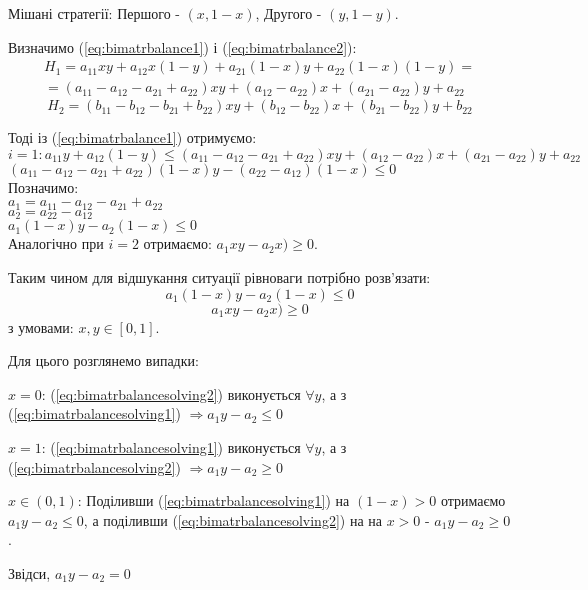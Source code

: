 \documentclass[12pt,a4paper]{book}
\newenvironment{slim_enumerate}{
\begin{enumerate}
  \setlength{\itemsep}{1pt}
  \setlength{\parskip}{0pt}
  \setlength{\parsep}{0pt}}
{\end{enumerate}}
\begin{document}
Мішані стратегії: Першого - $(x,1-x)$, Другого - $(y,1-y)$.

Визначимо (\ref{eq:bimatrbalance1}) і (\ref{eq:bimatrbalance2}):\\
\[\begin{array}{c}
H_1 = a_{11}xy + a_{12}x(1-y) + a_{21}(1-x)y + a_{22}(1-x)(1-y) =\\
= (a_{11}-a_{12}-a_{21}+a_{22})xy + (a_{12}-a_{22})x + (a_{21}-a_{22})y + a_{22}
\end{array}\]
\[H_2 = (b_{11}-b_{12}-b_{21}+b_{22})xy + (b_{12}-b_{22})x + (b_{21}-b_{22})y + b_{22} \]

Тоді із (\ref{eq:bimatrbalance1}) отримуємо:\\
$ i=1: a_{11}y+a_{12}(1-y) \leq (a_{11}-a_{12}-a_{21}+a_{22})xy + (a_{12}-a_{22})x + (a_{21}-a_{22})y + a_{22} $\\
$(a_{11}-a_{12}-a_{21}+a_{22})(1-x)y - (a_{22}-a_{12})(1-x) \leq 0$\\
Позначимо:\\
$a_1 = a_{11}-a_{12}-a_{21}+a_{22}$\\
$a_2 = a_{22}-a_{12}$\\
$a_1(1-x)y - a_2(1-x) \leq 0$\\
Аналогічно при $i=2$ отримаємо: $a_1xy - a_2x) \geq 0$.

Таким чином для відшукання ситуації рівноваги потрібно розв’язати:
\begin{equation} a_1(1-x)y - a_2(1-x) \leq 0 \label{eq:bimatrbalancesolving1} \end{equation}
\begin{equation} a_1xy - a_2x) \geq 0 \label{eq:bimatrbalancesolving2} \end{equation}
з умовами: $x,y \in [0,1]$.

Для цього розглянемо випадки:
\begin{slim_enumerate}
  \item $x=0$: (\ref{eq:bimatrbalancesolving2}) виконується $\forall y$, а з (\ref{eq:bimatrbalancesolving1}) $\Rightarrow a_1 y - a_2 \leq 0$
  \item $x=1$: (\ref{eq:bimatrbalancesolving1}) виконується $\forall y$, а з (\ref{eq:bimatrbalancesolving2}) $\Rightarrow a_1 y - a_2 \geq 0$
  \item $x \in (0,1)$: Поділивши (\ref{eq:bimatrbalancesolving1}) на $(1-x)>0$ отримаємо $a_1 y - a_2 \leq 0$, а поділивши (\ref{eq:bimatrbalancesolving2}) на на $x>0$ - $a_1 y - a_2 \geq 0$.

Звідси, $a_1 y - a_2 = 0$
\end{slim_enumerate}
\end{document}
